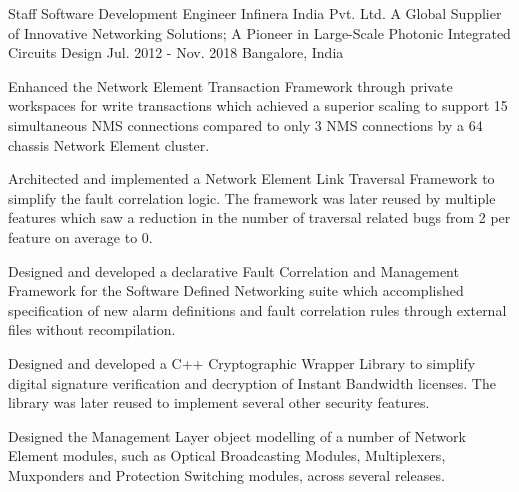 \begin{cventries}
  \expentry
    {Staff Software Development Engineer} %
    {Infinera India Pvt. Ltd.} %
    {A Global Supplier of Innovative Networking Solutions; A Pioneer in Large-Scale Photonic Integrated Circuits Design} %
    {Jul. 2012 - Nov. 2018} %
    {Bangalore, India} %
    {
      \begin{cvitems} %
      \item {Enhanced the Network Element Transaction Framework through private workspaces for write transactions which achieved a superior scaling to support 15 simultaneous NMS connections compared to only 3 NMS connections by a 64 chassis Network Element cluster.}
      \item {Architected and implemented a Network Element Link Traversal Framework to simplify the fault correlation logic. The framework was later reused by multiple features which saw a reduction in the number of traversal related bugs from 2 per feature on average to 0.}
      \item {Designed and developed a declarative Fault Correlation and Management Framework for the Software Defined Networking suite which accomplished specification of new alarm definitions and fault correlation rules through external files without recompilation.}
      \item {Designed and developed a C++ Cryptographic Wrapper Library to simplify digital signature verification and decryption of Instant Bandwidth licenses. The library was later reused to implement several other security features.}
      \item {Designed the Management Layer object modelling of a number of Network Element modules, such as Optical Broadcasting Modules, Multiplexers, Muxponders and Protection Switching modules, across several releases.}
      \end{cvitems}
    }


\end{cventries}

